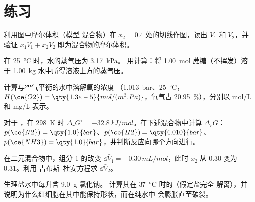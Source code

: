 \section{练习}

\begin{exercise}[$\star$]\label{exo:b2:chemical-potential:1}
利用图中摩尔体积（模型
混合物）在 $x_2 = 0.4$ 处的切线作图，读出 $\bar V_1$ 和 $\bar V_2$，并验证
$x_1\bar V_1 + x_2\bar V_2$ 即为混合物的摩尔体积。
\end{exercise}

\begin{exercise}[$\star$]\label{exo:b2:chemical-potential:2}
在 \qty{25}{\celsius} 时，水的蒸气压为 \qty{3.17}{kPa}。
用计算：将
\qty{1.00}{mol} 蔗糖（不挥发）溶于 \qty{1.00}{kg} 水中所得溶液上方的蒸气压。
\end{exercise}

\begin{exercise}[$\star$]\label{exo:b2:chemical-potential:3}
计算与空气平衡的水中溶解氧的浓度
（\qty{1.013}{bar}、\qty{25}{\celsius}，$H(\ce{O2}) =
\qty{1.3e-5}{mol/(m^3.Pa)}$，氧气占 \qty{20.95}{\percent}），分别以
\unit{mol/L} 和 \unit{mg/L} 表示。
\end{exercise}

\begin{exercise}[$\star$]\label{exo:b2:chemical-potential:4}
对于 ，在 \qty{298}{K} 时 $\Delta_r G^\circ =
\qty{-32.8}{kJ/mol}$。在下述混合物中计算 $\Delta_r G$：
$p(\ce{N2}) = \qty{1.0}{bar}$、$p(\ce{H2}) = \qty{0.010}{bar}$、
$p(\ce{NH3}) = \qty{1.0}{bar}$，并判断反应向哪个方向进行。
\end{exercise}

\begin{exercise}[$\star\star$]\label{exo:b2:chemical-potential:5}
在二元混合物中，组分 1 的改变
$\dd\bar V_1 = \qty{-0.30}{mL/mol}$，此时 $x_2$ 从 0.30 变为 0.31。利用
吉布斯–杜安方程求 $\dd\bar V_2$。
\end{exercise}

\begin{exercise}[$\star\star$]\label{exo:b2:chemical-potential:6}
生理盐水中每升含 \qty{9.0}{g} 氯化钠。
计算其在 \qty{37}{\celsius} 时的（假定盐完全
解离），并说明为什么红细胞在其中能保持形状，而在纯水中
会膨胀直至破裂。
\end{exercise}

